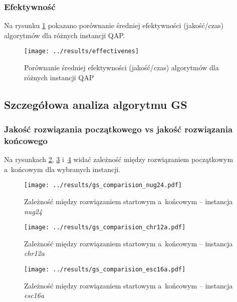 \documentclass{article}
\begin{document}
		\subsubsection{Efektywność}Na rysunku \ref{fig:effectivenes} pokazano porównanie średniej efektywności (jakość/czas) algorytmów dla różnych instancji QAP.
			\begin{figure}[h]
				\texttt{[image: ../results/effectivenes]}
				\caption{Porównanie średniej efektywności (jakość/czas) algorytmów dla różnych instancji QAP\label{fig:effectivenes}}
			\end{figure}


	\subsection{Szczegółowa analiza algorytmu GS}

		\subsubsection{Jakość rozwiązania początkowego vs jakość rozwiązania końcowego}
			Na rysunkach \ref{fig:gs.nug24}, \ref{fig:gs.chr12a} i~\ref{fig:gs.esc16a} widać zależność między rozwiązaniem początkowym a~końcowym dla wybranych instancji.
			
			\begin{figure}[h]
				\texttt{[image: ../results/gs\_comparision\_nug24.pdf]}
				\caption{Zależność między rozwiązaniem startowym a~końcowym -- instancja \emph{nug24}\label{fig:gs.nug24}}				
			\end{figure}
			
			\begin{figure}[h]
				\texttt{[image: ../results/gs\_comparision\_chr12a.pdf]}
				\caption{Zależność między rozwiązaniem startowym a~końcowym -- instancja \emph{chr12a}\label{fig:gs.chr12a}}				
			\end{figure}
			
			\begin{figure}[h]
				\texttt{[image: ../results/gs\_comparision\_esc16a.pdf]}
				\caption{Zależność między rozwiązaniem startowym a~końcowym -- instancja \emph{esc16a}\label{fig:gs.esc16a}}				
			\end{figure}
		
\end{document}
